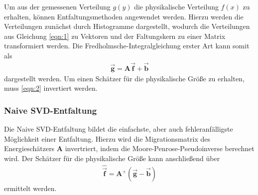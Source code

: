 Um aus der gemessenen Verteilung $g(y)$ die physikalische Verteilung $f(x)$ zu erhalten, können Entfaltungsmethoden angewendet werden.
Hierzu werden die Verteilungen zunächst durch Histogramme dargestellt, wodurch die Verteilungen aus Gleichung \eqref{eqn:1} zu Vektoren und der Faltungskern zu einer Matrix transformiert werden. Die Fredholmsche-Integralgleichung erster Art kann somit als 
\begin{align}
	\vec{\pmb{g}} = \pmb{A}\vec{\pmb{f}} + \vec{\pmb{b}}
	\label{eqn:2}
\end{align}
dargestellt werden.
Um einen Schätzer für die physikalische Größe zu erhalten, muss \eqref{eqn:2} invertiert werden. 


\subsubsection{Naive SVD-Entfaltung}
Die Naive SVD-Entfaltung bildet die einfachste, aber auch fehleranfälligste Möglichkeit einer Entfaltung. 
Hierzu wird die Migrationsmatrix des Energieschätzers $\pmb{A}$ invertriert, indem die Moore-Penrose-Pseudoinverse berechnet wird. Der Schätzer für die physikalische Größe kann anschließend über
\begin{align}
	\hat{\vec{\pmb{f}}} = \pmb{A}^{+}(\vec{\pmb{g}} - \vec{\pmb{b}})
	\label{eqn:NSVD}
\end{align}
ermittelt werden.


